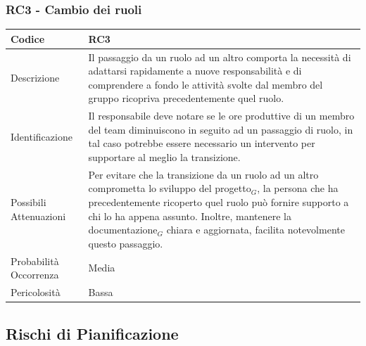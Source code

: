 \documentclass[10pt]{article}
\begin{document}
{    \subsubsection{RC3 - Cambio dei ruoli}
    \label{RC3}
    \begin{tabularx}{\textwidth}{|l|X|}
    \hline
    \rowcolor{gray!25}
    Codice & RC3 \\
    \hline
    Descrizione &  Il passaggio da un ruolo ad un altro comporta la necessità di adattarsi rapidamente a nuove responsabilità e di comprendere a fondo le attività svolte dal membro del gruppo ricopriva precedentemente quel ruolo. \\
    \hline
    Identificazione & Il responsabile deve notare se le ore produttive di un membro del team diminuiscono in seguito ad un passaggio di ruolo, in tal caso potrebbe essere necessario un intervento per supportare al meglio la transizione.  \\
    \hline
    Possibili Attenuazioni &  Per evitare che la transizione da un ruolo ad un altro comprometta lo sviluppo del progetto$_G$, la persona che ha precedentemente ricoperto quel ruolo può fornire supporto a chi lo ha appena assunto. Inoltre, mantenere la documentazione$_G$ chiara e aggiornata, facilita notevolmente questo passaggio. \\
    \hline
    Probabilità Occorrenza &  Media \\
    \hline
    Pericolosità & Bassa \\ 
    \hline
    \end{tabularx}
    
    
\subsection{Rischi di Pianificazione}
}
\end{document}
